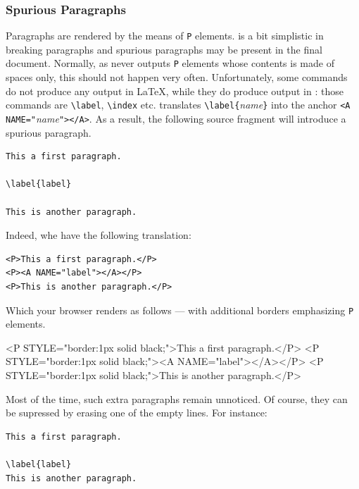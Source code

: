 \subsubsection{Spurious\label{spurious:par} Paragraphs}
Paragraphs are rendered by the means of \verb+P+ elements.
\hevea{} is a bit simplistic in breaking paragraphs and spurious paragraphs
may be present in the final \html{} document.
Normally, as \hevea{} never outputs \verb+P+ elements whose contents is
made of spaces only, this should not happen very often.
Unfortunately, some commands do not produce any output in \LaTeX,
while they do produce output in \hevea: those commands
are \verb+\label+, \verb+\index+ etc.
\hevea{} translates
\verb+\label{+\textit{name}\verb+}+ into the anchor
\verb+<A NAME="+\textit{name}\verb+"></A>+. As a result, the following
source fragment will introduce a spurious paragraph.
\begin{verbatim}
This a first paragraph.

\label{label}

This is another paragraph.
\end{verbatim}
Indeed, whe have the following translation:
\begin{verbatim}
<P>This a first paragraph.</P>
<P><A NAME="label"></A></P>
<P>This is another paragraph.</P>
\end{verbatim}
\ifhevea Which your browser renders as follows --- with additional borders
emphasizing \verb+P+ elements.
\begin{htmlout}%
\begin{rawhtml}
<P STYLE="border:1px solid black;">This a first paragraph.</P>
<P STYLE="border:1px solid black;"><A NAME="label"></A></P>
<P STYLE="border:1px solid black;">This is another paragraph.</P>
\end{rawhtml}%
\end{htmlout}%
\fi

Most of the time, such extra paragraphs remain unnoticed.
Of course, they can be supressed by erasing one of the empty
lines. For instance:
\begin{verbatim}
This a first paragraph.

\label{label}
This is another paragraph.
\end{verbatim}

